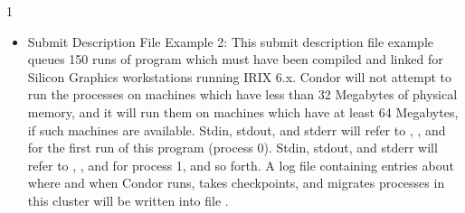 \begin{ManPage}{\label{man-condor-submit}}{1}
\begin{itemize}
\begin{verbatim}
      ####################
      #
      # submit description file
      # Example 1: queuing multiple jobs with differing
      # command line arguments and output files.
      #                                                                      
      ####################                                                   
                                                                         
      Executable     = foo                                                   
      Universe       = standard
                                                                         
      Arguments      = 15 2000                                               
      Output  = foo.out1                                                     
      Error   = foo.err1
      Queue                                                                  
                                                                         
      Arguments      = 30 2000                                               
      Output  = foo.out2                                                     
      Error   = foo.err2
      Queue                                                                  
                                                                         
      Arguments      = 45 6000                                               
      Output  = foo.out3                                                     
      Error   = foo.err3
      Queue                   
\end{verbatim}

\item{Submit Description File Example 2:} This submit description file
example queues 150
runs of program  which must have been compiled and linked for
Silicon Graphics workstations running IRIX 6.x.
Condor will not attempt
to run the processes on machines which have less than 32 Megabytes of
physical memory, and it will run them on machines which have at least 64
Megabytes, if such machines are available.
Stdin, stdout, and stderr will
refer to , , and  for the first run
of this program (process 0).
Stdin, stdout, and stderr will refer to
, , and  for process 1, and so forth.
A log file containing entries
about where and when Condor runs, takes checkpoints, and migrates processes
in this cluster will be written into file .


\end{itemize}
\end{ManPage}
